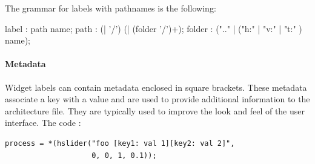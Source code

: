 \documentclass[a4paper,10pt]{book}
\begin{document}
The grammar for labels with pathnames is the following:

\begin{rail}
 label : path name;
 path : (| '/') (| (folder '/')+);
 folder : (".." | ("h:" | "v:" | "t:" ) name);
\end{rail}


\paragraph{Metadata}
Widget labels can contain metadata enclosed in square brackets. These metadata associate a key with a value and are used to provide additional information to the architecture file.  They are typically used to improve the look and feel of the user interface. 
The \faust code :
\begin{lstlisting}
process = *(hslider("foo [key1: val 1][key2: val 2]", 
					0, 0, 1, 0.1));
\end{lstlisting}
\end{document}
